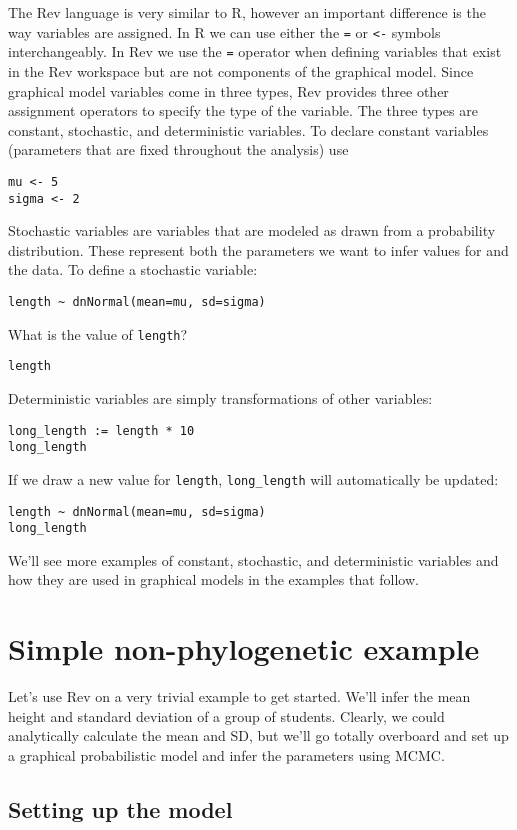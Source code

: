 \documentclass[11pt]{article}
\begin{document}
The Rev language is very similar to R, however an important 
difference is the way variables are assigned.
In R we can use either the \texttt{=} or \texttt{<-} symbols
interchangeably.
In Rev we use the \texttt{=} operator
when defining variables that exist in the Rev workspace
but are not components of the graphical model.
Since graphical model variables come in three types,
Rev provides three other assignment operators to specify
the type of the variable.
The three types are
constant, stochastic, and deterministic variables.
To declare constant variables (parameters
that are fixed throughout the analysis) use
\begin{verbatim}
mu <- 5
sigma <- 2
\end{verbatim}
Stochastic variables are variables that are modeled
as drawn from a probability distribution. 
These represent both the parameters we want to infer values for
and the data. To define a stochastic variable:
\begin{verbatim}
length ~ dnNormal(mean=mu, sd=sigma)
\end{verbatim}
What is the value of \texttt{length}?
\begin{verbatim}
length
\end{verbatim}
Deterministic variables are simply transformations of other variables:
\begin{verbatim}
long_length := length * 10
long_length
\end{verbatim}
If we draw a new value for \texttt{length}, \texttt{long\_length}
will automatically be updated:
\begin{verbatim}
length ~ dnNormal(mean=mu, sd=sigma)
long_length
\end{verbatim}
We'll see more examples of constant, stochastic, and deterministic variables
and how they are used in graphical models in the examples that follow.

\section{Simple non-phylogenetic example}

Let's use Rev on a very trivial example to get started.
We'll infer the mean height and standard deviation of a group of students.
Clearly, we could analytically calculate the mean and SD, but we'll
go totally overboard and
set up a graphical probabilistic model and infer the parameters using MCMC.

\subsection{Setting up the model}
\end{document}
